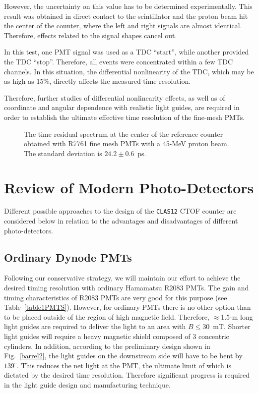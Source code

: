 \noindent
However, the uncertainty on this value has to be determined experimentally. 
This result was obtained in direct contact to the scintillator and the proton 
beam hit the center of the counter, where the left and right signals are almost 
identical.  Therefore, effects related to the signal shapes cancel out.

In this test, one PMT signal was used as a TDC ``start'', while another provided
the TDC ``stop''.  Therefore, all events were concentrated within a few TDC channels. 
In this situation, the differential nonlinearity of the TDC, which may be as high as 
15\%, directly affects the measured time resolution.   
     
Therefore, further studies of differential nonlinearity effects, as well as of 
coordinate and angular dependence with realistic light guides, are required in order 
to establish the ultimate effective time resolution of the fine-mesh PMTs.
 
\begin{figure}[htbp]
\vspace{8.0cm}
\caption{\small{The time residual spectrum at the center of the reference 
counter obtained with R7761 fine mesh PMTs with a 45-MeV proton beam.  The 
standard deviation is $24.2\pm0.6$~ps.}}
\label{finemesh02}
\end{figure}

\section{Review of Modern Photo-Detectors}
\label{phdrev}

Different possible approaches to the design of the {\tt CLAS12} CTOF
counter are considered below in relation to the advantages and disadvantages 
of different photo-detectors. 

\subsection{Ordinary Dynode PMTs}

Following our conservative strategy, we will maintain our effort to achieve 
the desired timing resolution with ordinary Hamamatsu R2083 PMTs.  The gain 
and timing characteristics of R2083 PMTs are very good for this purpose (see 
Table~\ref{table1PMTS}).  However, for ordinary PMTs there is no other option 
than to be placed outside of the region of high magnetic field.  Therefore, 
$\approx$1.5-m long light guides are required to deliver the light to an area 
with $B \le 30$~mT.  Shorter light guides will require a heavy magnetic shield 
composed of 3 concentric cylinders.  In addition, according to the preliminary 
design shown in Fig.~\ref{barrel2}, the light guides on the downstream side 
will have to be bent by $139^\circ$.  This reduces the net light at the PMT,
the ultimate limit of which is dictated by the desired time resolution.  
Therefore significant progress is required in the light guide design and 
manufacturing technique.

